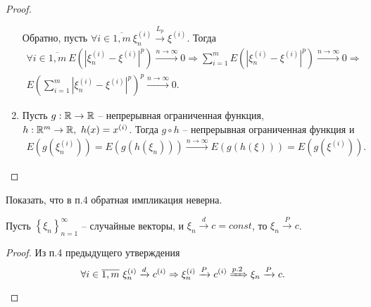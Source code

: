 \begin{proof}
\begin{enumerate}
		Обратно, пусть $\forall i\in \overline{1,m} \ \xi _{n}^{( i)}\xrightarrow{L_{p}} \xi ^{( i)}$. Тогда
		\begin{gather*}
		    \forall i \in \overline{1,m}\ E\left(\left|\xi_n^{(i)} - \xi^{(i)}\right|^p\right) \xrightarrow{n \rightarrow \infty} 0 \Rightarrow \sum_{i=1}^{m}E\left(\left|\xi_n^{(i)}- \xi^{(i)}\right|^p\right) \xrightarrow{n\rightarrow\infty} 0 \Rightarrow\\ E\left(\sum_{i=1}^{m}\left|\xi_n^{(i)}-\xi^{(i)}\right|^p\right)^p\xrightarrow{n\rightarrow\infty} 0.
		\end{gather*}
		
		\item Пусть $g:\mathbb{R}\rightarrow\mathbb{R}$ -- непрерывная ограниченная функция, $h:\mathbb{R}^m \rightarrow \mathbb{R},\ h(x) = x^{(i)}$. Тогда $g \circ h$ -- непрерывная ограниченная функция и
		\begin{gather*}
		    E\left(g\left(\xi_n^{(i)}\right)\right) = E\left(g\left(h\left(\xi_n\right)\right)\right) \xrightarrow{n \rightarrow \infty} E\left(g\left(h\left(\xi\right)\right)\right) = E\left(g\left(\xi^{(i)}\right)\right).
		\end{gather*}
	\end{enumerate}

\end{proof}

\begin{exercise}
	Показать, что в п.4 обратная импликация неверна.
\end{exercise}

\begin{proposition}
	Пусть $\left\{\xi_n\right\}_{n=1}^\infty$ -- случайные векторы, и $\xi_n \xrightarrow{d} c = const$, то $\xi_n \xrightarrow{P} c$.
\end{proposition}

\begin{proof}
	Из п.4 предыдущего утверждения
	\begin{gather*}
	    \forall i \in \overline{1,m}\ \xi_n^{(i)} \xrightarrow{d} c^{(i)} \Rightarrow \xi_n^{(i)} \xrightarrow{P} c^{(i)} \xRightarrow[]{p.2} \xi_n \xrightarrow{P} c.
	\end{gather*}
\end{proof}

